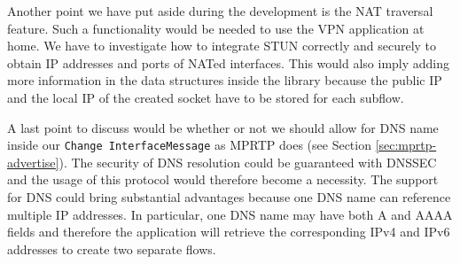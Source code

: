Another point we have put aside during the development is the NAT traversal feature. Such a functionality would be needed to use the VPN application at home. We have to investigate how to integrate STUN \cite{RFC5389} correctly and securely to obtain IP addresses and ports of NATed interfaces. This would also imply adding more information in the data structures inside the library because the public IP and the local IP of the created socket have to be stored for each subflow.

A last point to discuss would be whether or not we should allow for DNS name inside our \texttt{Change InterfaceMessage} as MPRTP does (see Section \ref{sec:mprtp-advertise}). The security of DNS resolution could be guaranteed with DNSSEC \cite{RFC6840} and the usage of this protocol would therefore become a necessity. The support for DNS could bring substantial advantages because one DNS name can reference multiple IP addresses. In particular, one DNS name may have both A and AAAA fields and therefore the application will retrieve the corresponding IPv4 and IPv6 addresses to create two separate flows.


